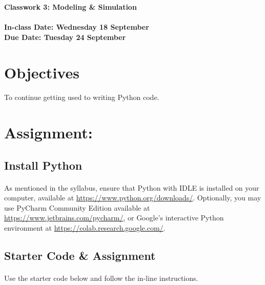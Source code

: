 \documentclass[letter,10pt]{article}
\begin{document}
    \huge
    \textbf{Classwork 3: Modeling \& Simulation}
    \normalsize
    \\ ~~ \\
    \textbf{In-class Date: Wednesday 18 September} \\
    \textbf{Due Date: Tuesday 24 September}
    
    \section*{Objectives}
    \paragraph{}To continue getting used to writing Python code.
    
    \section*{Assignment:}
    \subsection{Install Python}
    \paragraph{}As mentioned in the syllabus, ensure that Python with IDLE is installed on your computer, available at \url{https://www.python.org/downloads/}. Optionally, you may use PyCharm Community Edition available at \url{https://www.jetbrains.com/pycharm/}, or Google's interactive Python environment at \url{https://colab.research.google.com/}.
    
    \subsection*{Starter Code \& Assignment}
    \paragraph{}Use the starter code below and follow the in-line instructions.
    
\end{document}
